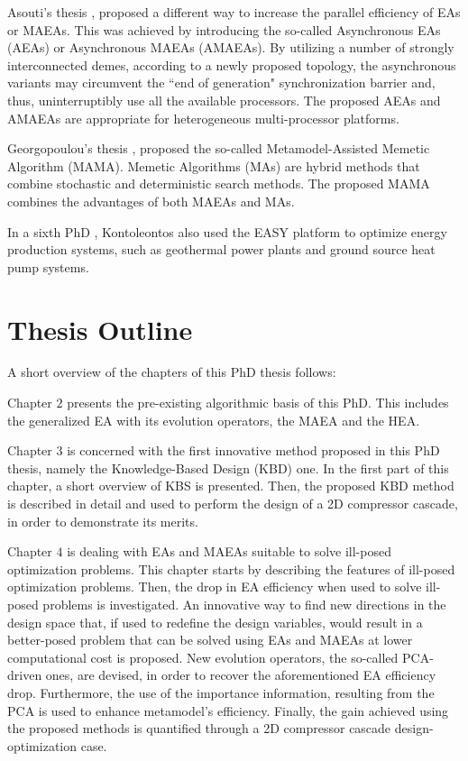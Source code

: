 Asouti's thesis \cite{phd_Vera}, proposed a different way to increase the parallel efficiency of EAs or MAEAs. This was achieved by introducing the so-called Asynchronous EAs (AEAs) or Asynchronous MAEAs (AMAEAs). By utilizing a number of strongly interconnected demes, according to a newly proposed topology, the asynchronous variants may circumvent the ``end of generation" synchronization barrier and, thus, uninterruptibly use all the available processors.     The proposed AEAs and AMAEAs are appropriate for heterogeneous multi-processor platforms. 


Georgopoulou's thesis \cite{phd_Chara}, proposed the so-called Metamodel-Assisted Memetic Algorithm (MAMA). Memetic Algorithms (MAs) are hybrid
methods that combine stochastic and deterministic search methods. The proposed MAMA combines the advantages of both MAEAs and MAs.
 
In a sixth PhD \cite{phd_eugene}, Kontoleontos also used the EASY platform to optimize energy production systems, such as
geothermal power plants and ground source heat pump systems.
 
 
\section{Thesis Outline} %
A short overview of the chapters of this PhD thesis follows:

Chapter $2$ presents the pre-existing algorithmic basis of this PhD. This includes the generalized EA with its evolution operators, the MAEA and the HEA.

Chapter $3$ is concerned with the first innovative method proposed in this PhD thesis, namely the Knowledge-Based Design (KBD) one. In the first part of this chapter, a short overview of KBS is presented. Then, the proposed KBD method is described in detail and used to perform the design of a 2D compressor cascade, in order to demonstrate its merits.

Chapter $4$ is dealing with EAs and MAEAs suitable to solve ill-posed optimization problems. This chapter starts by describing the features of ill-posed optimization problems. Then, the drop in EA efficiency when used to solve ill-posed problems is investigated. An innovative way to find new directions in the design space that, if used to redefine the design variables, would result in a better-posed problem that can be solved using EAs and MAEAs at lower computational cost is proposed.  New evolution operators, the so-called PCA-driven ones, are devised, in order to recover the aforementioned EA efficiency drop. Furthermore, the use of the importance information, resulting from the PCA is used to enhance metamodel's efficiency. Finally, the gain achieved using the proposed methods is quantified through a 2D compressor cascade design-optimization case.

